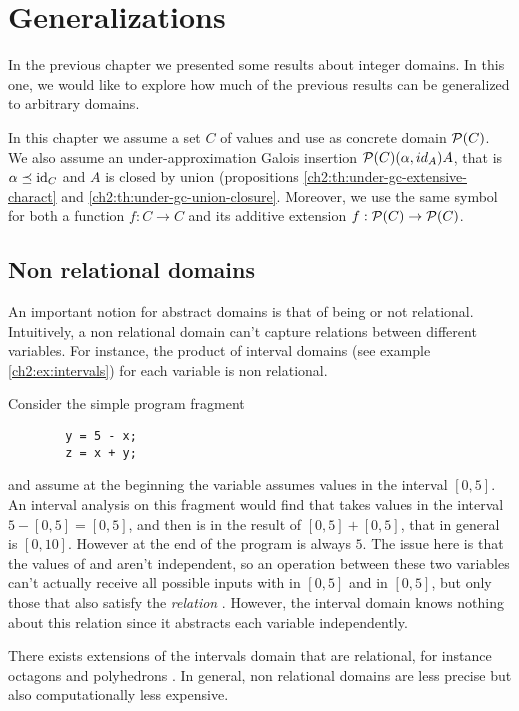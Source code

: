 \chapter{Generalizations}
In the previous chapter we presented some results about integer domains. In this one, we would like to explore how much of the previous results can be generalized to arbitrary domains.

In this chapter we assume a set $C$ of values and use as concrete domain $\mathcal{P}(C)$. We also assume an under-approximation Galois insertion $\mathcal{P}(C) (\alpha, id_A) A$, that is $\alpha \preceq \text{id}_C$ and $A$ is closed by union (propositions \ref{ch2:th:under-gc-extensive-charact} and \ref{ch2:th:under-gc-union-closure}.
Moreover, we use the same symbol for both a function $f : C \rightarrow C$ and its additive extension $f: \mathcal{P}(C) \rightarrow \mathcal{P}(C)$.

\section{Non relational domains}
An important notion for abstract domains is that of being or not relational. Intuitively, a non relational domain can't capture relations between different variables. For instance, the product of interval domains (see example \ref{ch2:ex:intervals}) for each variable is non relational.
\begin{example}
	Consider the simple program fragment
	\begin{verbatim}
		y = 5 - x;
		z = x + y;
	\end{verbatim}
	and assume at the beginning the variable  assumes values in the interval $[0, 5]$. An interval analysis on this fragment would find that  takes values in the interval $5 - [0, 5] = [0, 5]$, and then  is in the result of $[0, 5] + [0, 5]$, that in general is $[0, 10]$. However at the end of the program  is always $5$.
	The issue here is that the values of  and  aren't independent, so an operation between these two variables can't actually receive all possible inputs with  in $[0, 5]$ and  in $[0, 5]$, but only those that also satisfy the \textit{relation} . However, the interval domain knows nothing about this relation since it abstracts each variable independently.
\end{example}
There exists extensions of the intervals domain that are relational, for instance octagons \cite{mine-octagons} and polyhedrons \cite{cousot-polyhedrons}. In general, non relational domains are less precise but also computationally less expensive.

